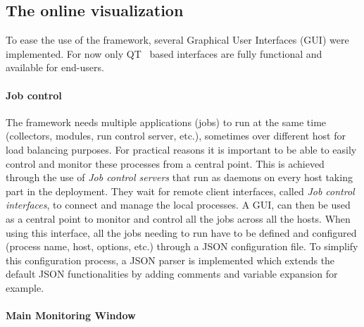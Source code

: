 \documentclass{webofc}
\begin{document}
\subsection{The online visualization}
\label{subsec:vis}

To ease the use of the framework, several Graphical User Interfaces (GUI) were implemented. For now only QT~\cite{QT} based interfaces are fully functional and available for end-users. 

\paragraph{Job control}\label{par:JobControl}

The framework needs multiple applications (jobs) to run at the same time (collectors, modules, run control server, etc.), sometimes over different host for load balancing purposes.
For practical reasons it is important to be able to easily control and monitor these processes from a central point.
This is achieved through the use of \textit{Job control servers} that run as daemons on every host taking part in the deployment.
They wait for remote client interfaces, called \textit{Job control interfaces}, to connect and manage the local processes.
A GUI, can then be used as a central point to monitor and control all the jobs across all the hosts.
When using this interface, all the jobs needing to run have to be defined and configured (process name, host, options, etc.) through a JSON configuration file. To simplify this configuration process, a JSON parser is implemented which extends the default JSON functionalities by adding comments and variable expansion for example.

\paragraph{Main Monitoring Window}\label{par:MainGUI}
\end{document}
